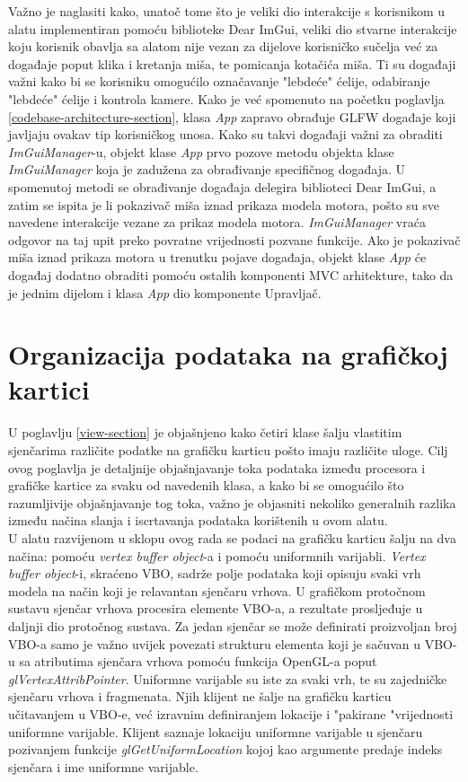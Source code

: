 \documentclass[times, utf8, diplomski]{fer}
\begin{document}
Važno je naglasiti kako, unatoč tome što je veliki dio interakcije s korisnikom u alatu implementiran pomoću biblioteke Dear ImGui, veliki dio stvarne interakcije koju korisnik obavlja sa alatom nije vezan za dijelove korisničko sučelja već za događaje poput klika i kretanja miša, te pomicanja kotačića miša. Ti su događaji važni kako bi se korisniku omogućilo označavanje "lebdeće" ćelije, odabiranje "lebdeće" ćelije i kontrola kamere. Kako je već spomenuto na početku poglavlja \ref{codebase-architecture-section}, klasa \textit{App} zapravo obrađuje GLFW događaje koji javljaju ovakav tip korisničkog unosa. Kako su takvi događaji važni za obraditi \textit{ImGuiManager}-u, objekt klase \textit{App} prvo pozove metodu objekta klase \textit{ImGuiManager} koja je zadužena za obrađivanje specifičnog događaja. U spomenutoj metodi se obrađivanje događaja delegira biblioteci Dear ImGui, a zatim se ispita je li pokazivač miša iznad prikaza modela motora, pošto su sve navedene interakcije vezane za prikaz modela motora. \textit{ImGuiManager} vraća odgovor na taj upit preko povratne vrijednosti pozvane funkcije. Ako je pokazivač miša iznad prikaza motora u trenutku pojave događaja, objekt klase \textit{App} će događaj dodatno obraditi pomoću ostalih komponenti MVC arhitekture, tako da je jednim dijelom i klasa \textit{App} dio komponente Upravljač.


\section{Organizacija podataka na grafičkoj kartici} \label{graphics-card-data-section}

U poglavlju \ref{view-section} je objašnjeno kako četiri klase šalju vlastitim sjenčarima različite podatke na grafičku karticu pošto imaju različite uloge. Cilj ovog poglavlja je detaljnije objašnjavanje toka podataka između procesora i grafičke kartice za svaku od navedenih klasa, a kako bi se omogućilo što razumljivije objašnjavanje tog toka, važno je objasniti nekoliko generalnih razlika između načina slanja i iscrtavanja podataka korištenih u ovom alatu.\\

U alatu razvijenom u sklopu ovog rada se podaci na grafičku karticu šalju na dva načina: pomoću  \textit{vertex buffer object}-a i pomoću uniformnih varijabli. \textit{Vertex buffer object}-i, skraćeno VBO, sadrže polje podataka koji opisuju svaki vrh modela na način koji je relavantan sjenčaru vrhova. U grafičkom protočnom sustavu sjenčar vrhova procesira elemente VBO-a, a rezultate prosljeđuje u daljnji dio protočnog sustava. Za jedan sjenčar se može definirati proizvoljan broj VBO-a samo je važno uvijek povezati strukturu elementa koji je sačuvan u VBO-u sa atributima sjenčara vrhova pomoću funkcija OpenGL-a poput \textit{glVertexAttribPointer}. Uniformne varijable su iste za svaki vrh, te su zajedničke sjenčaru vrhova i fragmenata. Njih klijent ne šalje na grafičku karticu učitavanjem u VBO-e, već izravnim definiranjem lokacije i "pakirane "vrijednosti uniformne varijable. Klijent saznaje lokaciju uniformne varijable u sjenčaru pozivanjem funkcije \textit{glGetUniformLocation} kojoj kao argumente predaje indeks sjenčara i ime uniformne varijable.\\
\end{document}
